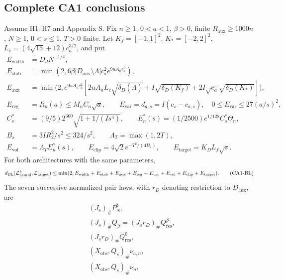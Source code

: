 \subsection{Complete CA1 conclusions}
\begin{theorem}\label{cm:CA1-budget}
Assume H1--H7 and Appendix S. Fix $n\ge1$, $0<a<1$, $\beta>0$,
finite $R_{\mathrm{aux}}\ge1000n$, $N\ge1$, $0<s\le1$, $T>0$ finite.
Let $K_f=[-1,1]^2$, $K_*=[-2,2]^2$,
$L_c=(4\sqrt{15}+12)c_a^{3/2}$, and put
\begin{align*}
 E_{\mathrm{width}}&=D_JN^{-1/4},\\
 E_{\mathrm{stab}}&=\min(2,6\beta|D_{\mathrm{aux}}\setminus\Lambda|c_a^2
                                   e^{9uA_nc_a^2}),\\
 E_{\mathrm{aux}}&=\min\bigl(2,e^{9uA_nc_a^2}
  [2uA_nL_c\sqrt{\delta_D(\overline\Lambda)}
  +I\sqrt{\delta_D(K_f)}
  +2I\sqrt{c_a}\sqrt{\delta_D(K_*)}]\bigr),\\
 E_{\mathrm{reg}}&=R_n(a)\le M_nC_n\sqrt a,\qquad
 E_{\mathrm{var}}=d_{a,s}=I(c_s-c_{a,s}),\quad0\le E_{\mathrm{var}}\le27(a/s)^2,\\
 C_s^*&=(9/5)2^{360}\sqrt{1+1/(Is^4)},\qquad
 E_n^*(s)=(1/2500)e^{1/128}C_s^*\Theta_n,\\
 B_s&=3IR_2^2/s^2\le324/s^2,\qquad\Lambda_T=\max(1,2T),\\
 E_{\mathrm{vol}}&=\Lambda_T E_n^*(s),\qquad
 E_{\mathrm{clip}}=4\sqrt2 e^{-T^2/(4B_s)},\qquad
 E_{\mathrm{target}}=K_DL_f\sqrt s .
\end{align*}
For both architectures with the same parameters,
\begin{equation}
 d_{\mathrm{BL}}(\mathcal L_{\mathrm{neural}}^{\mathfrak b},\mathcal L_{\mathrm{target}})
 \le\min(2,E_{\mathrm{width}}+E_{\mathrm{stab}}+E_{\mathrm{aux}}
       +E_{\mathrm{reg}}+E_{\mathrm{var}}+E_{\mathrm{vol}}
       +E_{\mathrm{clip}}+E_{\mathrm{target}}).
 \tag{CA1-BL}\label{cm:budget}
\end{equation}
The seven successive normalized pair laws, with $r_D$ denoting restriction
to $D_{\mathrm{aux}}$, are
\begin{align*}
 &(J_s)_\#P_N^{\mathfrak b},\\
 &(J_s)_\#Q_\beta=(J_s r_D)_\#Q_{\mathrm{res}}^\beta,\\
 &(J_s r_D)_\#Q_{\mathrm{res}}^0,\\
 &(X_{\mathrm{obs}},Q_s)_\#\nu_{a,n},\\
 &(X_{\mathrm{obs}},Q_s)_\#\nu_n,\\

\end{align*}
\end{theorem}
